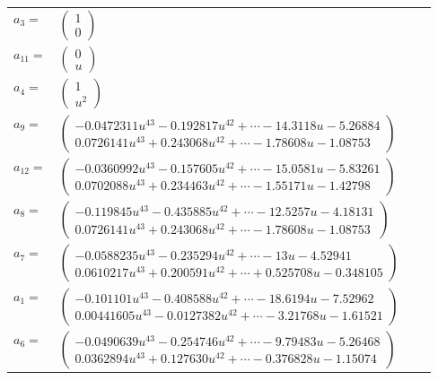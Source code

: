 \documentclass[1p]{elsarticle_modified}
\theoremstyle{definition}
\begin{document}
\begin{tabular}{m{7pt} m{180pt} m{7pt} m{180pt} }
\flushright $a_{3}=$&$\begin{pmatrix}1\\0\end{pmatrix}$ \\
\flushright $a_{11}=$&$\begin{pmatrix}0\\u\end{pmatrix}$ \\
\flushright $a_{4}=$&$\begin{pmatrix}1\\u^2\end{pmatrix}$ \\
\flushright $a_{9}=$&$\begin{pmatrix}-0.0472311 u^{43}-0.192817 u^{42}+\cdots-14.3118 u-5.26884\\0.0726141 u^{43}+0.243068 u^{42}+\cdots-1.78608 u-1.08753\end{pmatrix}$ \\
\flushright $a_{12}=$&$\begin{pmatrix}-0.0360992 u^{43}-0.157605 u^{42}+\cdots-15.0581 u-5.83261\\0.0702088 u^{43}+0.234463 u^{42}+\cdots-1.55171 u-1.42798\end{pmatrix}$ \\
\flushright $a_{8}=$&$\begin{pmatrix}-0.119845 u^{43}-0.435885 u^{42}+\cdots-12.5257 u-4.18131\\0.0726141 u^{43}+0.243068 u^{42}+\cdots-1.78608 u-1.08753\end{pmatrix}$ \\
\flushright $a_{7}=$&$\begin{pmatrix}-0.0588235 u^{43}-0.235294 u^{42}+\cdots-13 u-4.52941\\0.0610217 u^{43}+0.200591 u^{42}+\cdots+0.525708 u-0.348105\end{pmatrix}$ \\
\flushright $a_{1}=$&$\begin{pmatrix}-0.101101 u^{43}-0.408588 u^{42}+\cdots-18.6194 u-7.52962\\0.00441605 u^{43}-0.0127382 u^{42}+\cdots-3.21768 u-1.61521\end{pmatrix}$ \\
\flushright $a_{6}=$&$\begin{pmatrix}-0.0490639 u^{43}-0.254746 u^{42}+\cdots-9.79483 u-5.26468\\0.0362894 u^{43}+0.127630 u^{42}+\cdots-0.376828 u-1.15074\end{pmatrix}$ \\

\end{tabular}
\end{document}
